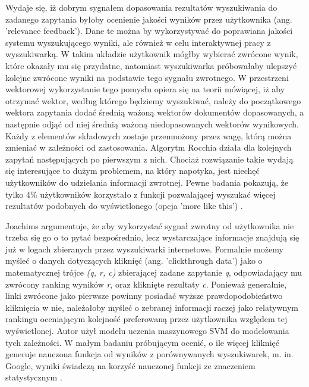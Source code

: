 Wydaje się, iż dobrym sygnałem dopasowania rezultatów wyszukiwania do zadanego
zapytania byłoby ocenienie jakości wyników przez użytkownika (ang. 'relevance feedback'). Dane te
można by wykorzystywać do poprawiana jakości systemu wyszukującego wyniki, ale również w celu interaktywnej pracy z wyszukiwarką. W takim układzie użytkownik mógłby wybierać zwrócone wynik,
które okazały mu się przydatne, natomiast wyszukiwarka próbowałaby ulepszyć kolejne zwrócone
wyniki na podstawie tego sygnału zwrotnego. W przestrzeni wektorowej wykorzystanie tego pomysłu opiera się na teorii mówiącej, iż aby otrzymać wektor, według którego będziemy
wyszukiwać, należy do początkowego wektora zapytania dodać średnią ważoną wektorów dokumentów dopasowanych, a następnie odjąć od niej
średnią ważoną niedopasowanych wektorów wynikowych. Każdy z
elementów składowych zostaje przemnożony przez wagę, którą można zmieniać w zależności od
zastosowania. Algorytm Rocchia działa dla kolejnych zapytań następujących po pierwszym z nich. Chociaż rozwiązanie takie wydają się interesujące to dużym problemem, na który
napotyka, jest niechęć użytkowników do udzielania informacji zwrotnej. Pewne badania pokazują, że
tylko 4\% użytkowników korzystało z funkcji pozwalającej wyszukać więcej rezultatów podobnych do
wyświetlonego (opcja 'more like this') \autocite[s. 222]{introtoinformationretrieval}. \newline 

Joachims argumentuje, że aby wykorzystać sygnał zwrotny
od użytkownika nie trzeba się go o to pytać bezpośrednio, lecz wystarczające informacje znajdują się
już w logach zbieranych przez wyszukiwarki internetowe. Formalnie możemy myśleć o danych
dotyczących kliknięć (ang. 'clickthrough data') jako o matematycznej trójce {\it (q, r, c)} zbierającej zadane
zapytanie {\it q}, odpowiadający mu zwrócony ranking wyników {\it r}, oraz kliknięte rezultaty {\it c}. Ponieważ
generalnie, linki zwrócone jako pierwsze powinny posiadać wyższe prawdopodobieństwo kliknięcia w
nie, należałoby myśleć o zebranej informacji raczej jako relatywnym rankingu oceniającym kolejność
preferowaną przez użytkownika względem tej wyświetlonej. Autor użył modelu uczenia maszynowego
SVM do modelowania tych zależności. W małym badaniu próbującym ocenić, o ile więcej kliknięć
generuje nauczona funkcja od wyników z porównywanych wyszukiwarek, m. in. Google, wyniki
świadczą na korzyść nauczonej funkcji ze znaczeniem statystycznym \autocite{joachimsclickthroughdata}.\newline

